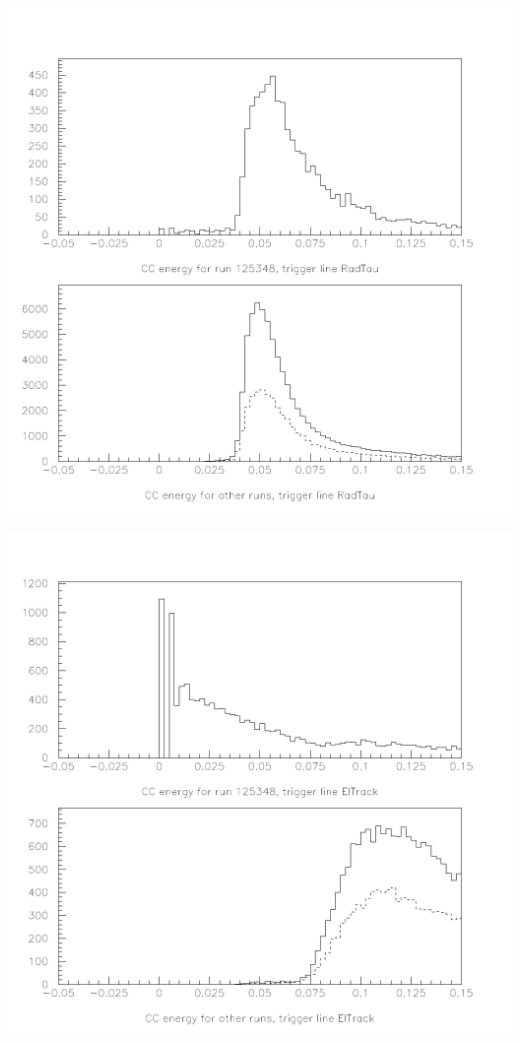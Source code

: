 \documentclass[landscape]{article}
\begin{document}
\begin{center}
  \includegraphics[height=\textheight]{tr2_nether_radtau.pdf}
\end{center}

\begin{center}
  \includegraphics[height=\textheight]{tr2_nether_eltrack.pdf}
\end{center}
\end{document}
